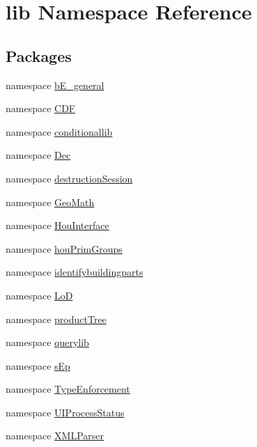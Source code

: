 \hypertarget{namespacelib}{\section{lib Namespace Reference}
\label{namespacelib}
}
\subsection*{Packages}
\begin{DoxyCompactItemize}
\item 
namespace \hyperlink{namespacelib_1_1b_e__general}{b\-E\-\_\-general}
\item 
namespace \hyperlink{namespacelib_1_1_c_d_f}{C\-D\-F}
\item 
namespace \hyperlink{namespacelib_1_1conditionallib}{conditionallib}
\item 
namespace \hyperlink{namespacelib_1_1_dec}{Dec}
\item 
namespace \hyperlink{namespacelib_1_1destruction_session}{destruction\-Session}
\item 
namespace \hyperlink{namespacelib_1_1_geo_math}{Geo\-Math}
\item 
namespace \hyperlink{namespacelib_1_1_hou_interface}{Hou\-Interface}
\item 
namespace \hyperlink{namespacelib_1_1hou_prim_groups}{hou\-Prim\-Groups}
\item 
namespace \hyperlink{namespacelib_1_1identifybuildingparts}{identifybuildingparts}
\item 
namespace \hyperlink{namespacelib_1_1_lo_d}{Lo\-D}
\item 
namespace \hyperlink{namespacelib_1_1product_tree}{product\-Tree}
\item 
namespace \hyperlink{namespacelib_1_1querylib}{querylib}
\item 
namespace \hyperlink{namespacelib_1_1s_ep}{s\-Ep}
\item 
namespace \hyperlink{namespacelib_1_1_type_enforcement}{Type\-Enforcement}
\item 
namespace \hyperlink{namespacelib_1_1_u_i_process_status}{U\-I\-Process\-Status}
\item 
namespace \hyperlink{namespacelib_1_1_x_m_l_parser}{X\-M\-L\-Parser}
\end{DoxyCompactItemize}

